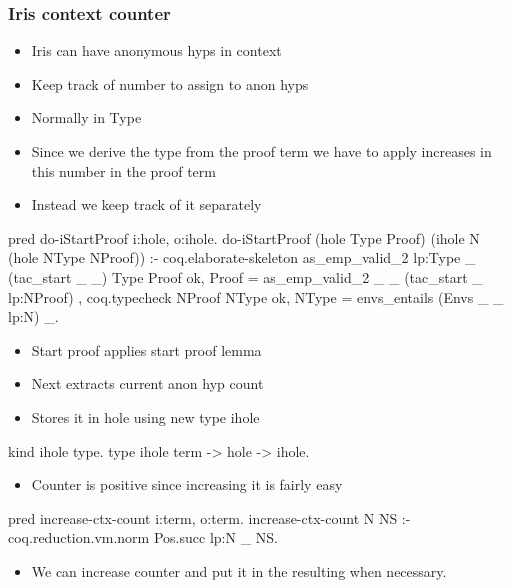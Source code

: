 \documentclass[thesis.tex]{subfiles}
\begin{document}
{\subsubsection{Iris context counter}
\begin{itemize}
  \item Iris can have anonymous hyps in context
  \item Keep track of number to assign to anon hyps
  \item Normally in Type
  \item Since we derive the type from the proof term we have to apply increases in this number in the proof term
  \item Instead we keep track of it separately
\end{itemize}
\begin{elpicode}
  pred do-iStartProof i:hole, o:ihole.
  do-iStartProof (hole Type Proof) (ihole N (hole NType NProof)) :- 
    coq.elaborate-skeleton {{ as_emp_valid_2 lp:Type _ (tac_start _ _) }} Type Proof ok,
    Proof = {{ as_emp_valid_2 _ _ (tac_start _ lp:NProof) }},
    coq.typecheck NProof NType ok,
    NType = {{ envs_entails (Envs _ _ lp:N) _}}.
\end{elpicode}
\begin{itemize}
  \item Start proof applies start proof lemma
  \item Next extracts current anon hyp count
  \item Stores it in hole using new type ihole
\end{itemize}
\begin{elpicode}
  kind ihole type.
  type ihole term -> hole -> ihole. %
\end{elpicode}
\begin{itemize}
  \item Counter is \coq positive since increasing it is fairly easy
\end{itemize}
\begin{elpicode}
  pred increase-ctx-count i:term, o:term.
  increase-ctx-count N NS :-
    coq.reduction.vm.norm {{ Pos.succ lp:N }} _ NS.
\end{elpicode}
\begin{itemize}
  \item We can increase counter and put it in the resulting  when necessary.
\end{itemize}

}
\end{document}
